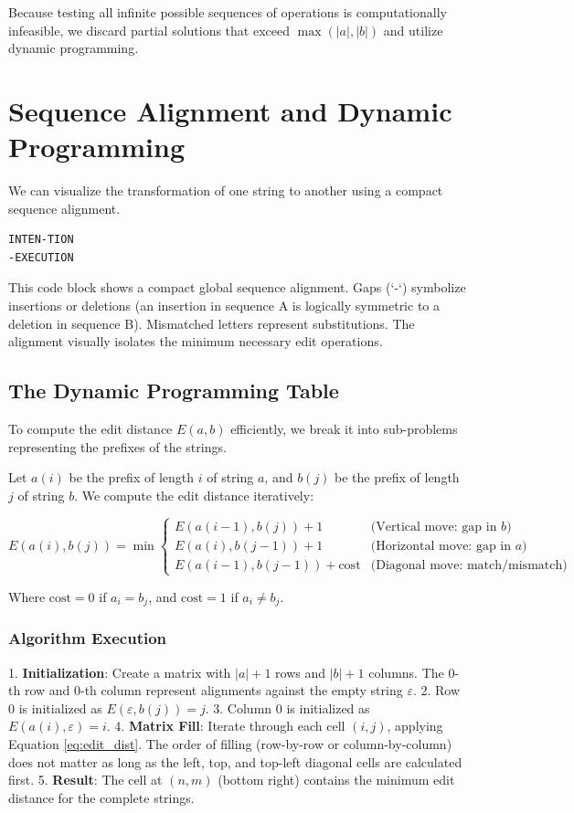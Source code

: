 Because testing all infinite possible sequences of operations is computationally infeasible, we discard partial solutions that exceed $\max(|a|, |b|)$ and utilize dynamic programming.

\section{Sequence Alignment and Dynamic Programming}

We can visualize the transformation of one string to another using a compact sequence alignment.

\begin{verbatim}
INTEN-TION
-EXECUTION
\end{verbatim}

This code block shows a compact global sequence alignment. Gaps (`-`) symbolize insertions or deletions (an insertion in sequence A is logically symmetric to a deletion in sequence B). Mismatched letters represent substitutions. The alignment visually isolates the minimum necessary edit operations.

\subsection{The Dynamic Programming Table}
To compute the edit distance $E(a,b)$ efficiently, we break it into sub-problems representing the prefixes of the strings. 

Let $a(i)$ be the prefix of length $i$ of string $a$, and $b(j)$ be the prefix of length $j$ of string $b$. We compute the edit distance iteratively:

\begin{equation} \label{eq:edit_dist}
E(a(i), b(j)) = \min 
\begin{cases} 
E(a(i-1), b(j)) + 1 & \text{(Vertical move: gap in } b \text{)} \\
E(a(i), b(j-1)) + 1 & \text{(Horizontal move: gap in } a \text{)} \\
E(a(i-1), b(j-1)) + \text{cost} & \text{(Diagonal move: match/mismatch)}
\end{cases}
\end{equation}

Where $\text{cost} = 0$ if $a_i = b_j$, and $\text{cost} = 1$ if $a_i \neq b_j$.

\subsubsection{Algorithm Execution}
1. \textbf{Initialization}: Create a matrix with $|a|+1$ rows and $|b|+1$ columns. The 0-th row and 0-th column represent alignments against the empty string $\varepsilon$.
2. Row 0 is initialized as $E(\varepsilon, b(j)) = j$.
3. Column 0 is initialized as $E(a(i), \varepsilon) = i$.
4. \textbf{Matrix Fill}: Iterate through each cell $(i,j)$, applying Equation \eqref{eq:edit_dist}. The order of filling (row-by-row or column-by-column) does not matter as long as the left, top, and top-left diagonal cells are calculated first.
5. \textbf{Result}: The cell at $(n, m)$ (bottom right) contains the minimum edit distance for the complete strings.

